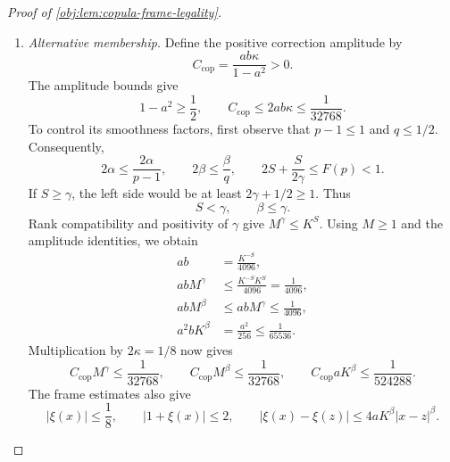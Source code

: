 \begin{proof}[Proof of \cref{obj:lem:copula-frame-legality}]
\begin{enumerate}
The membership calculation applies to valid construction inputs satisfying
\[
\varepsilon Lu=b,\qquad \varepsilon L^p\le10.
\]
In the null branch, the table identities reduce to
\[
e_P(x)=\frac{1+a\mathcal F_\lambda(x)}2,
\qquad
m_{0,P}(x)=b\mathcal F_\eta(x),
\qquad
\tau_P(x)=0.
\]
The frame envelope and amplitude bounds imply
\[
|\xi(x)|\le a\sqrt2\le\frac18,\qquad
\frac14\le e_P(x)\le\frac34,\qquad
|m_{0,P}(x)|\le b\sqrt2\le\frac12.
\]
The frame Hölder estimates, together with the amplitude-power identities, give
\[
\begin{aligned}
|e_P(x)-e_P(z)|
&\le2aK^\alpha|x-z|^\alpha
=\frac18|x-z|^\alpha
\le20|x-z|^\alpha,\\
|m_{0,P}(x)-m_{0,P}(z)|
&\le4bK^\beta|x-z|^\beta
=\frac1{64}|x-z|^\beta
\le20|x-z|^\beta.
\end{aligned}
\]
The effect is continuous, has supremum norm zero, and has zero Hölder differences. These estimates establish
\cref{obj:ass:overlap,obj:ass:propensity-smoothness,obj:ass:baseline-smoothness,obj:ass:effect-smoothness,obj:ass:baseline-cap,obj:ass:effect-cap}.
The normalized conditional table is integrated against \(\lambda\), so
\(P_X=\lambda\), as required by \cref{obj:ass:uniform}. The exact conditional-moment formula yields
\[
\int_{\mathbb R}|y|^p Q_{(1+\ell)/2,P}(dy\mid x)
=\varepsilon L^p\le10,
\]
and hence \cref{obj:ass:raw-moment}. Finally, \(\tau_P=0\) supplies
\cref{obj:ass:null-constancy} with constant zero. Therefore
\(P\in H_0(v)\) by \cref{obj:def:null}. The finite-moment tuning satisfies the two displayed input conditions by the first step.

\item \textit{Alternative membership.}
Define the positive correction amplitude by
\[
C_{\mathrm{cop}}=\frac{ab\kappa}{1-a^2}>0.
\]
The amplitude bounds give
\[
1-a^2\ge\frac12,\qquad
C_{\mathrm{cop}}\le2ab\kappa\le\frac1{32768}.
\]
To control its smoothness factors, first observe that \(p-1\le1\) and \(q\le1/2\). Consequently,
\[
2\alpha\le\frac{2\alpha}{p-1},
\qquad
2\beta\le\frac{\beta}{q},
\qquad
2S+\frac{S}{2\gamma}\le F(p)<1.
\]
If \(S\ge\gamma\), the left side would be at least
\(2\gamma+1/2\ge1\). Thus
\[
S<\gamma,\qquad \beta\le\gamma.
\]
Rank compatibility and positivity of \(\gamma\) give
\(M^\gamma\le K^S\). Using \(M\ge1\) and the amplitude identities, we obtain
\[
\begin{aligned}
ab&=\frac{K^{-S}}{4096},\\
abM^\gamma&\le\frac{K^{-S}K^S}{4096}=\frac1{4096},\\
abM^\beta&\le abM^\gamma\le\frac1{4096},\\
a^2bK^\beta&=\frac{a^2}{256}\le\frac1{65536}.
\end{aligned}
\]
Multiplication by \(2\kappa=1/8\) now gives
\[
C_{\mathrm{cop}}M^\gamma\le\frac1{32768},
\qquad
C_{\mathrm{cop}}M^\beta\le\frac1{32768},
\qquad
C_{\mathrm{cop}}aK^\beta\le\frac1{524288}.
\]
The frame estimates also give
\[
|\xi(x)|\le\frac18,\qquad
|1+\xi(x)|\le2,\qquad
|\xi(x)-\xi(z)|
\le4aK^\beta|x-z|^\beta.
\]


\end{enumerate}
\end{proof}
